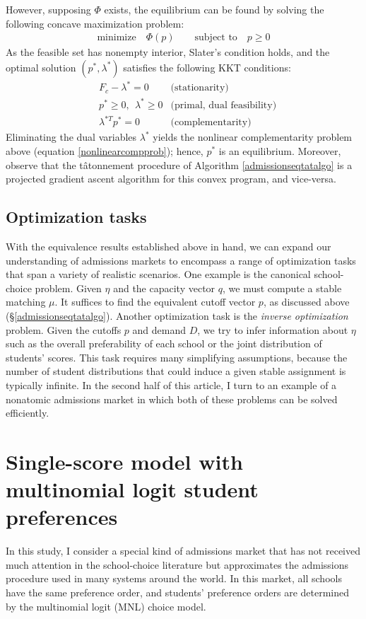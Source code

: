 \documentclass[12pt]{article}
\numberwithin{equation}{subsection}
\theoremstyle{definition}
\begin{document}
However, supposing $\Phi$ exists, the equilibrium can be found by solving the following concave maximization problem:
\begin{align*}
\text{minimize} \quad \Phi(p) \qquad \text{subject to} \quad  p \geq 0 
\end{align*}
As the feasible set has nonempty interior, Slater's condition holds, and the optimal solution $(p^*, \lambda^*)$ satisfies the following KKT conditions:
\begin{align*}
&F_c - \lambda^* = 0 & \text{(stationarity)}\\
&p^* \geq 0, ~~ \lambda^* \geq 0  & \text{(primal, dual feasibility)}\\
&\lambda^{*T} p^*=0  & \text{(complementarity)}
\end{align*}
Eliminating the dual variables $\lambda^*$ yields the nonlinear complementarity problem above (equation \eqref{nonlinearcompprob}); hence, $p^*$ is an equilibrium. Moreover, observe that the t\^{a}tonnement procedure of Algorithm \ref{admissionseqtatalgo} is a projected gradient ascent algorithm for this convex program, and vice-versa. 

\subsection{Optimization tasks}
With the equivalence results established above in hand, we can expand our understanding of admissions markets to encompass a range of optimization tasks that span a variety of realistic scenarios. One example is the canonical school-choice problem. Given $\eta$ and the capacity vector $q$, we must compute a stable matching $\mu$. It suffices to find the equivalent cutoff vector $p$, as discussed above (\S\ref{admissionseqtatalgo}). Another optimization task is the \emph{inverse optimization} problem. Given the cutoffs $p$ and demand $D$, we try to infer information about $\eta$ such as the overall preferability of each school or the joint distribution of students' scores. This task requires many simplifying assumptions, because the number of student distributions that could induce a given stable assignment is typically infinite. In the second half of this article, I turn to an example of a nonatomic admissions market in which both of these problems can be solved efficiently.






\pagebreak

\section{Single-score model with multinomial logit student preferences} \label{singlescoremodel}
In this study, I consider a special kind of admissions market that has not received much attention in the school-choice literature but approximates the admissions procedure used in many systems around the world. In this market, all schools have the same preference order, and students' preference orders are determined by the multinomial logit (MNL) choice model.
\end{document}
